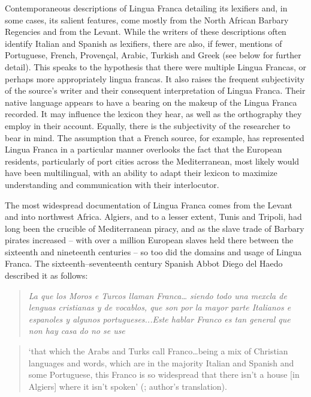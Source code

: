 \documentclass[output=paper]{langsci/langscibook}
\begin{document}
	Contemporaneous descriptions of Lingua Franca detailing its lexifiers and, in some cases, its salient features, come mostly from the North African Barbary Regencies and from the Levant. While the writers of these descriptions often identify Italian and Spanish as lexifiers, there are also, if fewer, mentions of Portuguese, French, Provençal, Arabic, Turkish and Greek (see below for further detail). This speaks to the hypothesis that there were multiple Lingua Francas, or perhaps more appropriately lingua francas. It also raises the frequent subjectivity of the source’s writer and their consequent interpretation of Lingua Franca. Their native language appears to have a bearing on the makeup of the Lingua Franca recorded. It may influence the lexicon they hear, as well as the orthography they employ in their account. Equally, there is the subjectivity of the researcher to bear in mind. The assumption that a French source, for example, has represented Lingua Franca in a particular manner overlooks the fact that the European residents, particularly of port cities across the Mediterranean, most likely would have been multilingual, with an ability to adapt their lexicon to maximize understanding and communication with their interlocutor. 
	
	The most widespread documentation of Lingua Franca comes from the Levant and into northwest Africa. Algiers, and to a lesser extent, Tunis and Tripoli, had long been the crucible of Mediterranean piracy, and as the slave trade of Barbary pirates increased – with over a million European slaves held there between the sixteenth and nineteenth centuries \citep[23]{Davis2004} – so too did the domains and usage of Lingua Franca. The sixteenth–seventeenth century Spanish Abbot Diego del Haedo described it as follows: 
	
	\begin{quote}
	\textit{La que los Moros e Turcos llaman Franca… siendo todo una mexcla de lenguas cristianas y de vocablos, que son por la mayor parte Italianos e espanoles y algunos portugueses...Este hablar Franco es tan general que non hay casa do no se use}
	\end{quote}
	
	\begin{quote}
	‘that which the Arabs and Turks call Franco…being a mix of Christian languages and words, which are in the majority Italian and Spanish and some Portuguese, this Franco is so widespread that there isn’t a house [in Algiers] where it isn’t spoken’  (\citealt[24]{Haedo1612}; author’s translation).
	\end{quote}
	
\end{document}
